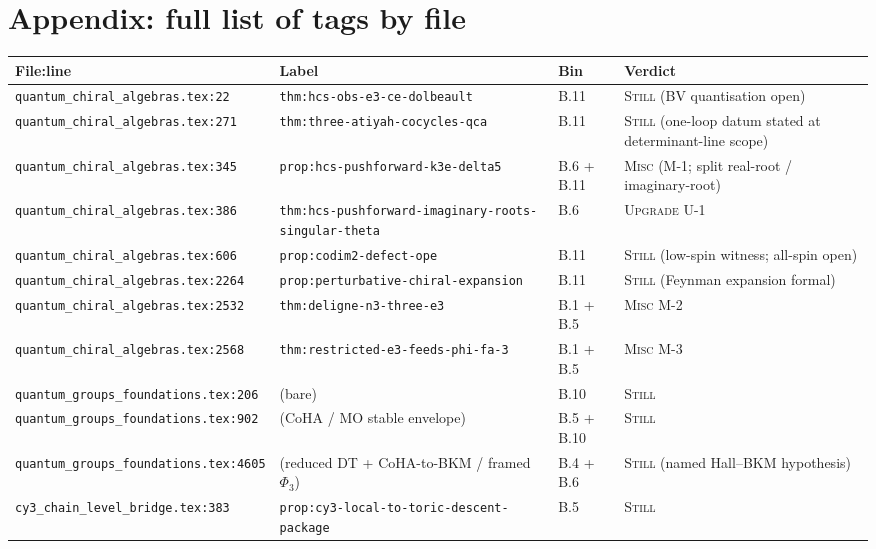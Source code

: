 \documentclass[11pt]{amsart}
\begin{document}
{{%
\section{Appendix: full list of tags by file}
\label{sec:appendix-full-list}

\small
\begin{longtable}{@{}p{5.5cm}p{3cm}p{2cm}p{3.5cm}@{}}
\toprule
File:line & Label & Bin & Verdict \\
\midrule\endhead

\texttt{quantum\_chiral\_algebras.tex:22} & \texttt{thm:hcs-obs-e3-ce-dolbeault} & B.11 & \textsc{Still} (BV quantisation open) \\
\texttt{quantum\_chiral\_algebras.tex:271} & \texttt{thm:three-atiyah-cocycles-qca} & B.11 & \textsc{Still} (one-loop datum stated at determinant-line scope) \\
\texttt{quantum\_chiral\_algebras.tex:345} & \texttt{prop:hcs-pushforward-k3e-delta5} & B.6 + B.11 & \textsc{Misc} (M-1; split real-root / imaginary-root) \\
\texttt{quantum\_chiral\_algebras.tex:386} & \texttt{thm:hcs-pushforward-imaginary-roots-singular-theta} & B.6 & \textsc{Upgrade} U-1 \\
\texttt{quantum\_chiral\_algebras.tex:606} & \texttt{prop:codim2-defect-ope} & B.11 & \textsc{Still} (low-spin witness; all-spin open) \\
\texttt{quantum\_chiral\_algebras.tex:2264} & \texttt{prop:perturbative-chiral-expansion} & B.11 & \textsc{Still} (Feynman expansion formal) \\
\texttt{quantum\_chiral\_algebras.tex:2532} & \texttt{thm:deligne-n3-three-e3} & B.1 + B.5 & \textsc{Misc} M-2 \\
\texttt{quantum\_chiral\_algebras.tex:2568} & \texttt{thm:restricted-e3-feeds-phi-fa-3} & B.1 + B.5 & \textsc{Misc} M-3 \\
\texttt{quantum\_groups\_foundations.tex:206} & (bare) & B.10 & \textsc{Still} \\
\texttt{quantum\_groups\_foundations.tex:902} & (CoHA / MO stable envelope) & B.5 + B.10 & \textsc{Still} \\
\texttt{quantum\_groups\_foundations.tex:4605} & (reduced DT + CoHA-to-BKM / framed $\Phi_3$) & B.4 + B.6 & \textsc{Still} (named Hall--BKM hypothesis) \\
\texttt{cy3\_chain\_level\_bridge.tex:383} & \texttt{prop:cy3-local-to-toric-descent-package} & B.5 & \textsc{Still} \\

\end{longtable}}}
\end{document}
